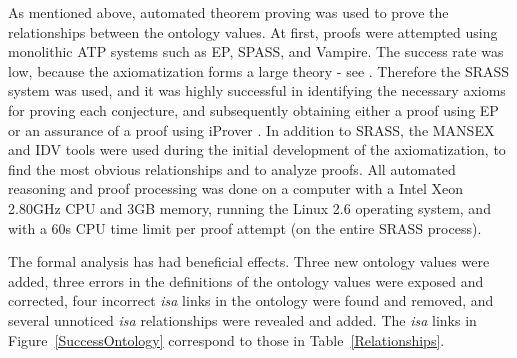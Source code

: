 \documentclass[a4paper]{easychair}
\begin{document}
As mentioned above, automated theorem proving was used to prove the
relationships between the ontology values.
At first, proofs were attempted using monolithic ATP systems such as EP, 
SPASS, and Vampire.
The success rate was low, because the axiomatization forms a
large theory - see \cite{SUS07}.
Therefore the SRASS system \cite{SP07} was used, and it was highly successful
in identifying the necessary axioms for proving each conjecture, and 
subsequently obtaining either a proof using EP or an assurance of a proof 
using iProver \cite{Kor08}.
In addition to SRASS, the MANSEX \cite{SYT09} and IDV \cite{TPS07}
tools were used during the initial development of the axiomatization, to
find the most obvious relationships and to analyze proofs.
All automated reasoning and proof processing was done on a computer with 
a Intel Xeon 2.80GHz CPU and 3GB memory, running the Linux 2.6 operating 
system, and with a 60s CPU time limit per proof attempt (on the entire SRASS 
process).

The formal analysis has had beneficial effects.
Three new ontology values were added,
three errors in the definitions of the ontology values were exposed and
corrected, four incorrect {\em isa} links in the ontology
were found and removed, and several unnoticed  {\em isa} relationships
were revealed and added.
The {\em isa} links in Figure~\ref{SuccessOntology} correspond to those
in Table~\ref{Relationships}.
\end{document}
